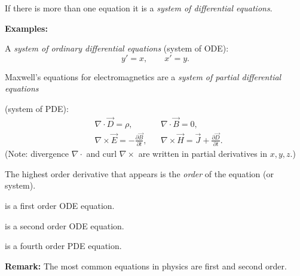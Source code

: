 \documentclass[10pt,aspectratio=169]{beamer}
\begin{document}
\begin{frame}

If there is more than one equation it is a
\emph{system of differential equations}.

\medskip
\pause

\textbf{Examples:}

\medskip
\pause

A \emph{system of ordinary differential equations} (system of ODE):
\[
y' = x , \qquad x' = y .
\]

\medskip
\pause

Maxwell's equations for electromagnetics are a
\emph{system of partial differential equations}

(system of PDE):
\begin{align*}
& \nabla \cdot \vec{D} = \rho, & & \nabla \cdot \vec{B} = 0 , \\
& \nabla \times \vec{E} = - \frac{\partial \vec{B}}{\partial t}, &
& \nabla \times \vec{H} = \vec{J} + \frac{\partial \vec{D}}{\partial t} .
\end{align*}
(Note: 
divergence $\nabla \cdot$ and 
curl $\nabla \times$ are written in partial derivatives in $x,y,z$.)

\end{frame}

\begin{frame}
The highest order derivative that appears is the \emph{order} of the
equation (or system).

\medskip
\pause

\quad{}\hspace*{2in}\quad is a first order ODE equation.

\medskip
\pause

\quad{}\hspace*{2in}\quad is a second order ODE equation.

\medskip
\pause

\quad{}\hspace*{2in}\quad is a fourth order PDE equation.

\bigskip
\pause

\textbf{Remark:} The most common equations in physics are first and second order.

\end{frame}
\end{document}
